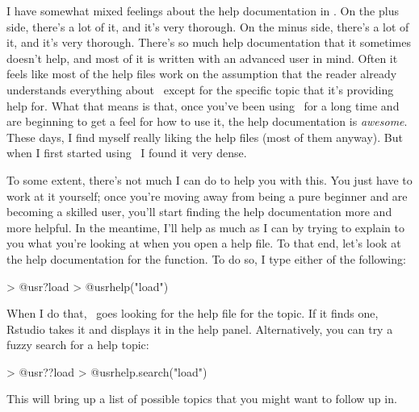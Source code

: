 

I have somewhat mixed feelings about the help documentation in \R. On the plus side, there's a lot of it, and it's very thorough. On the minus side, there's a lot of it, and it's very thorough. There's so much help documentation that it sometimes doesn't help, and most of it is written with an advanced user in mind. Often it feels like most of the help files work on the assumption that the reader already understands everything about \R\ except for the specific topic that it's providing help for. What that means is that, once you've been using \R\ for a long time and are beginning to get a feel for how to use it, the help documentation is {\it awesome}. These days, I find myself really liking the help files (most of them anyway). But when I first started using \R\ I found it very dense.

To some extent, there's not much I can do to help you with this. You just have to work at it yourself; once you're moving away from being a pure beginner and are becoming a skilled user, you'll start finding the help documentation more and more helpful. In the meantime, I'll help as much as I can by trying to explain to you what you're looking at when you open a help file. To that end, let's look at the help documentation for the  function. To do so, I type either of the following:
\begin{rblock1}
> @usr{?load}
> @usr{help("load")}
\end{rblock1}
When I do that, \R\ goes looking for the help file for the  topic. If it finds one, Rstudio takes it and displays it in the help panel. Alternatively, you can try a fuzzy search for a help topic:  
\begin{rblock1}
> @usr{??load}
> @usr{help.search("load")}
\end{rblock1}
This will bring up a list of possible topics that you might want to follow up in. 

